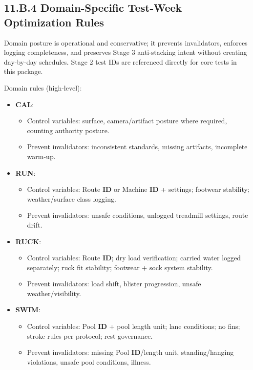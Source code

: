 \documentclass[10pt]{article}
\begin{document}
\endgroup

\newpage
\subsection*{11.B.4 Domain-Specific Test-Week Optimization Rules}
{}

Domain posture is operational and conservative; it prevents invalidators, enforces logging completeness, and preserves Stage 3 anti-stacking intent without creating day-by-day schedules. Stage 2 test IDs are referenced directly for core tests in this package.

Domain rules (high-level):

\begin{itemize}
\item \textbf{CAL}:
\begin{itemize}
\item Control variables: surface, camera/artifact posture where required, counting authority posture.
\item Prevent invalidators: inconsistent standards, missing artifacts, incomplete warm-up.
\end{itemize}
\item \textbf{RUN}:
\begin{itemize}
\item Control variables: Route \textbf{ID} or Machine \textbf{ID} + settings; footwear stability; weather/surface class logging.
\item Prevent invalidators: unsafe conditions, unlogged treadmill settings, route drift.
\end{itemize}
\item \textbf{RUCK}:
\begin{itemize}
\item Control variables: Route \textbf{ID}; dry load verification; carried water logged separately; ruck fit stability; footwear + sock system stability.
\item Prevent invalidators: load shift, blister progression, unsafe weather/visibility.
\end{itemize}
\item \textbf{SWIM}:
\begin{itemize}
\item Control variables: Pool \textbf{ID} + pool length unit; lane conditions; no fins; stroke rules per protocol; rest governance.
\item Prevent invalidators: missing Pool \textbf{ID}/length unit, standing/hanging violations, unsafe pool conditions, illness.

\end{itemize}
\end{itemize}
\end{document}

